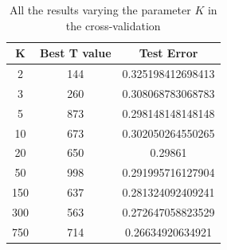 \begin{table}
\centering
\begin{tabular}{|c|c|c|}
	\hline
	K & Best T value & Test Error \\
	\hline
	2 & 144 & 0.325198412698413 \\
	\hline
	3 & 260 & 0.308068783068783 \\
	\hline
	5 & 873 & 0.298148148148148 \\
	\hline
	10 & 673 & 0.302050264550265 \\
	\hline
	20 & 650 & 0.29861 \\
	\hline
	50 & 998 & 0.291995716127904 \\
	\hline
	150 & 637 & 0.281324092409241 \\
	\hline
	300 & 563 & 0.272647058823529 \\
	\hline
	750 & 714 & 0.26634920634921 \\
	\hline
\end{tabular}
\caption{All the results varying the parameter $K$ in the cross-validation}
\label{tab:results}
\end{table}
